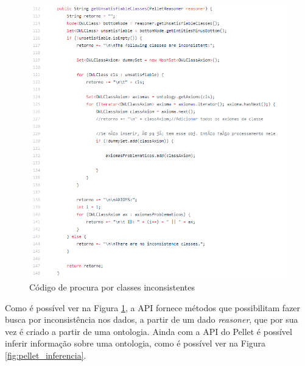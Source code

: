 \documentclass{bcc}
\begin{document}
\begin{figure}[H]
\centering
\includegraphics[width=1\textwidth]{Figuras/pellet_inconsistencia.png}
\caption{Código de procura por classes inconsistentes}
\label{fig:pellet_inconsistencia}
\end{figure}

Como é possível ver na Figura \ref{fig:pellet_inconsistencia}, a API fornece métodos que possibilitam fazer busca por inconsistência nos dados, a partir de um dado \textit{reasoner}, que por sua vez é criado a partir de uma ontologia. Ainda com a API do Pellet é possível inferir informação sobre uma ontologia, como é possível ver na Figura \ref{fig:pellet_inferencia}.
\end{document}
